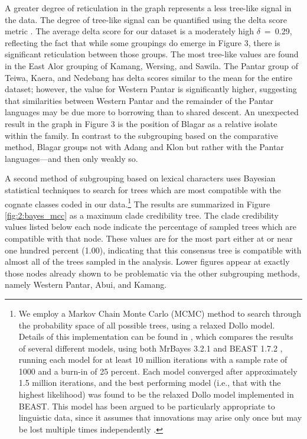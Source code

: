 A greater degree of reticulation in the graph represents a less tree-like signal in the data. The degree of tree-like signal can be quantified using the delta score metric \citep{WichmannEtAl2011,HollandEtAl2002}. The average delta score for our dataset is a moderately high $\delta $~=~0.29, reflecting the fact that while some groupings do emerge in Figure 3, there is significant reticulation between those groups. The most tree-like values are found in the East Alor grouping of Kamang, Wersing, and Sawila. The Pantar group of Teiwa, Kaera, and Nedebang has delta scores similar to the mean for the entire dataset; however, the value for Western Pantar is significantly higher, suggesting that similarities between Western Pantar and the remainder of the Pantar languages may be due more to borrowing than to shared descent. An unexpected result in the graph in Figure 3 is the position of Blagar as a relative isolate within the family. In contrast to the subgrouping based on the comparative method, Blagar 
groups not with Adang and Klon but rather with the Pantar languages---and then only weakly so. 

A second method of subgrouping based on lexical characters uses Bayesian statistical techniques to search for trees which are most compatible with the cognate classes coded in our data.\footnote{ We employ a Markov Chain Monte Carlo (MCMC) method to search through the probability space of all possible trees, using a relaxed Dollo model. Details of this implementation can be found in \citet{RobinsonEtAl2012internal}, which compares the results of  several different models, using both MrBayes 3.2.1  \citep{RonquistEtAl2003} and BEAST 1.7.2 \citep{DrummondEtAl2012}, running each model for at least 10 million iterations with a sample rate of 1000 and a burn-in of 25 percent. Each model converged after approximately 1.5 million iterations, and the best performing model (i.e., that with the highest likelihood) was found to be the relaxed Dollo model implemented in BEAST. This model has been argued to be particularly appropriate to linguistic data, since it assumes that 
innovations may arise only once but may be lost multiple times independently \citep{Pagel2009}. } The results are summarized in Figure \ref{fig:2:bayes_mcc} as a maximum clade credibility tree. The clade credibility values listed below each node indicate the percentage of sampled trees which are compatible with that node. These values are for the most part either at or near one hundred percent (1.00), indicating that this consensus tree is compatible with almost all of the trees sampled in the analysis. Lower figures appear at exactly those nodes already shown to be problematic via the other subgrouping methods, namely Western Pantar, Abui, and Kamang. 

